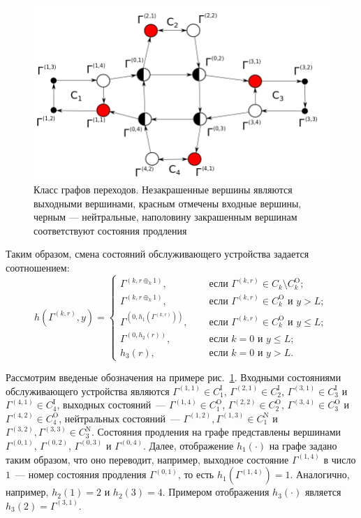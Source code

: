 \documentclass[a4paper,12pt,russian]{extarticle}
\newcommand{\ga}[1]{\Gamma^{\left( #1 \right)} }
\begin{document}
\begin{figure}[hb]\centering
\includegraphics[scale=0.5]{GraphScheme3.png} 
\caption{Класс графов переходов. Незакрашенные вершины являются выходными вершинами, красным отмечены входные вершины, черным --- нейтральные, наполовину закрашенным вершинам соответствуют состояния продления}
\label{GraphScheme}
\end{figure}

Таким образом, смена состояний обслуживающего устройства задается соотношением:
\begin{equation}
h(\ga{k,r},y) = 
\begin{cases}
\ga{k,r\oplus_k 1},& \quad \text{ если } \ga{k,r}\in C_k\setminus C_k^{\mathrm{O}};\\
\ga{k,r\oplus_k 1},& \quad \text{ если } \ga{k,r}\in C_k^{\mathrm{O}} \text{ и } y>L;\\
\ga{0,h_1(\ga{k,r})},& \quad \text{ если } \ga{k,r}\in C_k^{\mathrm{O}} \text{ и } y\leqslant L;\\
\ga{0,h_2(r)},& \quad \text{ если } k=0 \text{ и } y\leqslant L;\\
h_3(r),& \quad \text{ если } k=0 \text{ и } y > L.
\end{cases}
\label{hLaw}
\end{equation}

Рассмотрим введеные обозначения на примере рис.~\ref{GraphScheme}. Входными состояниями обслуживающего устройства 	являются $\ga{1,1} \in C_1^{\mathrm{I}}$, $\ga{2,1} \in C_2^{\mathrm{I}}$, $\ga{3,1} \in C_3^{\mathrm{I}}$ и $\ga{4,1} \in C_4^{\mathrm{I}}$, выходных состояний~--- $\ga{1,4} \in C_1^{\mathrm{O}}$, $\ga{2,2} \in C_2^{\mathrm{O}}$, $\ga{3,4} \in C_3^{\mathrm{O}}$ и $\ga{4,2} \in C_4^{\mathrm{O}}$, нейтральных состояний~--- $\ga{1,2}, \ga{1,3} \in C_1^{\mathrm{N}}$ и $\ga{3,2}, \ga{3,3} \in C_3^{\mathrm{N}}$. Состояния продления на графе представлены вершинами $\ga{0,1}$, $\ga{0,2}$, $\ga{0,3}$ и $\ga{0,4}$. Далее, отображение $h_1(\cdot)$ на графе задано таким образом, что оно переводит, например, выходное состояние $\ga{1,4}$ в число $1$~--- номер состояния продления $\ga{0,1}$, то есть $h_1(\ga{1,4})=1$. Аналогично, например, $h_2(1)=2$ и $h_2(3)=4$. Примером отображения $h_3(\cdot)$ является $h_3(2)=\ga{3,1}$.
\end{document}
